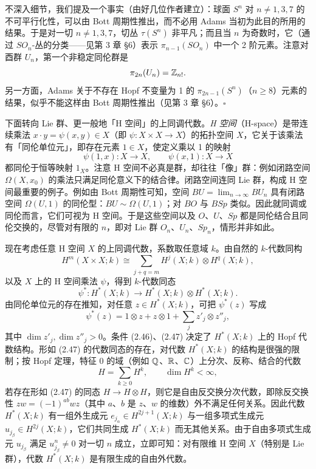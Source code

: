 \begin{remark}{}
不深入细节，我们提及一个事实（由好几位作者建立）：球面 $S^n$ 对 $n\ne1,3,7$ 的不可平行化性，可以由 Bott 周期性推出，而不必用 Adams 当初为此目的所用的结果。于是对一切 $n\ne1,3,7$，切丛 $\tau(S^n)$ 非平凡；而且当 $n$ 为奇数时，它（通过 $SO_n$-丛的分类——见第 3 章 §6）表示 $\pi_{n-1}(SO_n)$ 中一个 2 阶元素。注意对酉群 $U_n$，第一个非稳定同伦群是
\[
  \pi_{2n}(U_n)=\mathbb{Z}_{n!}.
\]
另一方面，Adams 关于不存在 Hopf 不变量为 1 的 $\pi_{2n-1}(S^n)$（$n\ge8$）元素的结果，似乎不能这样由 Bott 周期性推出（见第 3 章 §6）。\hfill$\square$
\end{remark}

下面转向 Lie 群、更一般地「H 空间」的上同调代数。\emph{H 空间}（H-space）是带连续乘法 $x\cdot y=\psi(x,y)\in X$（即 $\psi:X\times X\to X$）的拓扑空间 $X$，它关于该乘法有「同伦单位元」，即存在元素 $1\in X$，使定义乘以 1 的映射
\[
  \psi(1,x):X\to X,\qquad \psi(x,1):X\to X
\]
都同伦于恒等映射 $1_X$。注意 H 空间不必真是群，却往往「像」群：例如闭路空间 $\Omega(X,x_0)$ 的乘法只满足同伦意义下的结合律。闭路空间连同 Lie 群，构成 H 空间最重要的例子。例如由 Bott 周期性可知，空间 $BU=\lim_{n\to\infty}BU_n$ 具有闭路空间 $\Omega(U,1)$ 的同伦型：$BU\sim\Omega(U,1)$；对 $BO$ 与 $BSp$ 类似。因此就同调或同伦而言，它们可视为 H 空间。于是这些空间以及 $O$、$U$、$Sp$ 都是同伦结合且同伦交换的，尽管对有限的 $n$，即对 Lie 群 $O_n$、$U_n$、$Sp_n$，情形并非如此。

现在考虑任意 H 空间 $X$ 的上同调代数，系数取任意域 $k$。由自然的 $k$-代数同构
\[
  H^m(X\times X;k)\cong\sum_{j+q=m}H^j(X;k)\otimes H^q(X;k),
\]
以及 $X$ 上的 H 空间乘法 $\psi$，得到 $k$-代数同态
\begin{equation}
  \psi^*:H^*(X;k)\to H^*(X;k)\otimes H^*(X;k). \tag{2.46}
\end{equation}
由同伦单位元的存在推知，对任意 $z\in H^*(X;k)$，可把 $\psi^*(z)$ 写成
\begin{equation}
  \psi^*(z)=1\otimes z+z\otimes1+\sum_j z'_j\otimes z''_j, \tag{2.47}
\end{equation}
其中 $\dim z'_j,\dim z''_j>0$。条件 (2.46)、(2.47) 决定了 $H^*(X;k)$ 上的 Hopf 代数结构。形如 (2.47) 的代数同态的存在，对代数 $H^*(X;k)$ 的结构是很强的限制；按 Hopf 定理，特征 0 的域（例如 $\mathbb{Q}$、$\mathbb{R}$、$\mathbb{C}$）上分次、反称、结合的代数
\[
  H=\sum_{k\ge0}H^k,\qquad\dim H^k<\infty,
\]
若存在形如 (2.47) 的同态 $H\to H\otimes H$，则它是自由反交换分次代数，即除反交换性 $zw=(-1)^{ab}wz$（其中 $a$、$b$ 是 $z$、$w$ 的维数）外不满足任何关系。因此代数 $H^*(X;k)$ 有一组外生成元 $e_{j_\alpha}\in H^{2j+1}(X;k)$ 与一组多项式生成元 $u_{j_\beta}\in H^{2j}(X;k)$，它们共同生成 $H^*(X;k)$ 而无其他关系。由于自由多项式生成元 $u_{j_\beta}$ 满足 $u_{j_\beta}^n\ne0$ 对一切 $n$ 成立，立即可知：对有限维 H 空间 $X$（特别是 Lie 群），代数 $H^*(X;k)$ 是有限生成的自由外代数。

